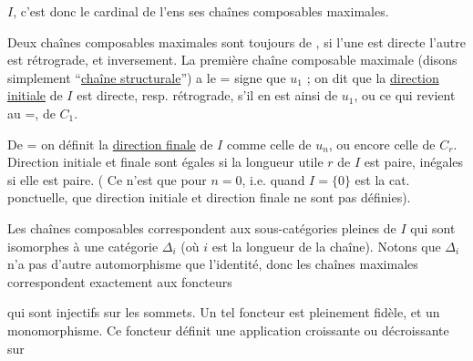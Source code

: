 
$I$, c'est donc le cardinal de l'ens  ses chaînes composables maximales.

Deux chaînes composables maximales sont toujours de  , si l'une est directe l'autre est rétrograde, et inversement.  La première chaîne composable maximale  (disons simplement ``\uline{chaîne structurale}'') a le $\mathord{=}$ signe que $u_1$ ;   on dit que la \uline{direction initiale} de $I$ est directe, resp. rétrograde, s'il en est ainsi de $u_1$, ou ce qui revient au $\mathord{=}$, de $C_1$.

De $\mathord{=}$ on définit la \uline{direction finale} de $I$ comme celle de $u_n$, ou encore celle de $C_r$.  Direction initiale et finale sont égales si la longueur utile $r$ de $I$ est paire, inégales si elle est paire. (\uline{} Ce n'est que pour $n=0$, i.e. quand $I=\{0\}$ est la cat. ponctuelle, que direction initiale et direction finale ne sont pas définies).

Les chaînes composables correspondent aux sous-catégories pleines de $I$ qui sont isomorphes à une catégorie $\mathbb{\Delta}_i$ (où $i$ est la longueur de la chaîne). Notons que $\mathbb{\Delta}_i$ n'a pas d'autre automorphisme que l'identité, donc les chaînes maximales  correspondent exactement aux foncteurs


qui sont  injectifs sur les sommets. Un tel foncteur est  pleinement fidèle, et un monomorphisme.  Ce foncteur définit une application  croissante ou  décroissante sur

